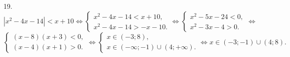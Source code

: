 19. $|x^2-4x-14|<x+10\Leftrightarrow \begin{cases}x^2-4x-14<x+10,\\ x^2-4x-14>-x-10.\end{cases}\Leftrightarrow
\begin{cases}x^2-5x-24<0,\\ x^2-3x-4>0.\end{cases}\Leftrightarrow$\\$
\begin{cases}(x-8)(x+3)<0,\\ (x-4)(x+1)>0.\end{cases}\Leftrightarrow
\begin{cases}x\in(-3;8),\\ x\in(-\infty;-1)\cup(4;+\infty).\end{cases}\Leftrightarrow x\in (-3;-1)\cup(4;8).$\\
